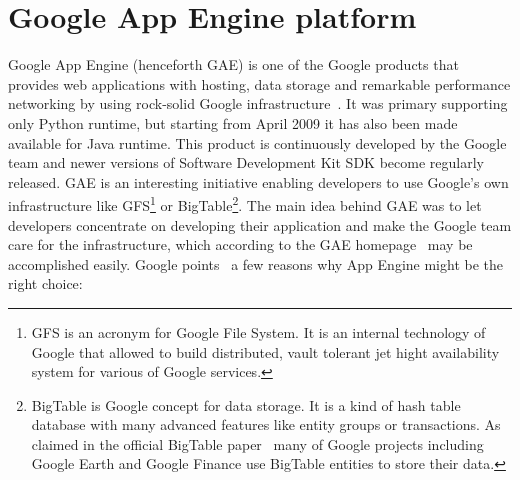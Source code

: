 \section{Google App Engine platform}\label{sec:gae_general}
Google App Engine (henceforth GAE) is one of the Google products that provides web applications with hosting, data storage and remarkable performance networking by using rock-solid Google infrastructure~\cite[page 1]{gae_develop}. It was primary supporting only Python runtime, but starting from April 2009 it has also been made available for Java runtime. This product is continuously developed by the Google team and newer versions of Software Development Kit SDK become regularly released. GAE is an interesting initiative enabling developers to use Google's own infrastructure like GFS\footnote{GFS is an acronym for Google File System. It is an internal technology of Google that allowed to build distributed, vault tolerant jet hight availability system for various of Google services.} or BigTable\footnote{BigTable is Google concept for data storage. It is a kind of hash table database with many advanced features like entity groups or transactions. As claimed in the official BigTable paper~\cite{bigtable_about} many of Google projects including Google Earth and Google Finance use BigTable entities to store their data.}. The main idea behind GAE was to let developers concentrate on developing their application and make the Google team care for the infrastructure, which according to the GAE homepage~\cite{gae_homepage} may be accomplished easily. Google points~\cite{gae_why} a few reasons why App Engine might be the right choice: 
